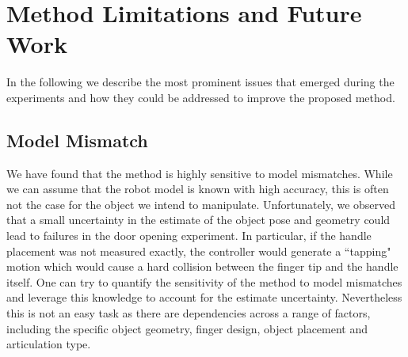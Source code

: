

\section{Method Limitations and Future Work}\label{sec:limitations_and_future_works}
In the following we describe the most prominent issues that emerged during the experiments and how they could be addressed to improve the proposed method.

\subsection{Model Mismatch}
We have found that the method is highly sensitive to model mismatches. While we can assume that the robot model is known with high accuracy, this is often not the case for the object we intend to manipulate. Unfortunately, we observed that a small uncertainty in the estimate of the object pose and geometry could lead to failures in the door opening experiment. In particular, if the handle placement was not measured exactly, the controller would generate a ``tapping" motion which would cause a hard collision between the finger tip and the handle itself. One can try to quantify the sensitivity of the method to model mismatches and leverage this knowledge to account for the estimate uncertainty. Nevertheless this is not an easy task as there are dependencies across a range of factors, including the specific object geometry, finger design, object placement and articulation type. 

